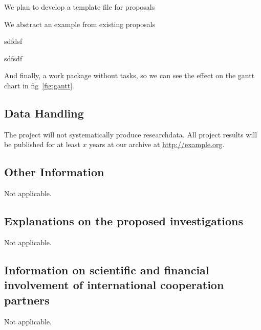 \begin{workplan}
\begin{workarea}[id=systems,title={System Development}]
\begin{workpackage}[id=temple,lead=pcg,
  title= Proposal Template,short=Template,jacuRM=12]

We plan to develop a template file for {\pn} proposals

We abstract an example from existing proposals
\begin{tasklist}
  \begin{task}[wphases=6-12]
    sdfdsf 
  \end{task}
  \begin{task}[id=temple2,wphases=18-24,requires=\taskin{t3}{class}]
    sdfsdf
  \end{task} 
\end{tasklist}
\end{workpackage}

\begin{workpackage}[id=workphase,title=A work package without tasks,
  wphases=0-4!.5]
  
  And finally, a work package without tasks, so we can see the effect on the gantt chart
  in fig~\ref{fig:gantt}.
\end{workpackage}
\end{workarea}
\end{workplan} 

\ganttchart[draft,xscale=.45] 

\subsection{Data Handling }

The \pn project will not systematically produce researchdata. All project results will be
published for at least $x$ years at our archive at \url{http://example.org}.

\subsection{Other Information } Not applicable.

\subsection{Explanations on the proposed investigations } Not applicable.

\subsection{Information on scientific and financial involvement of international cooperation partners } Not applicable.


